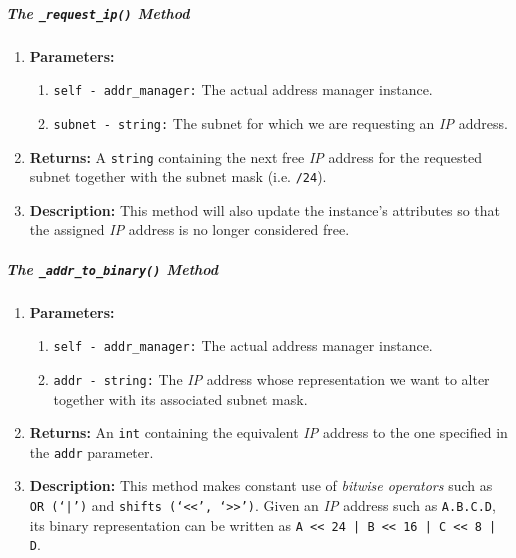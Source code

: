        \subparagraph{The \texttt{\_request\_ip()} Method}
            \begin{enumerate}
                \item \textbf{Parameters:}
                \begin{enumerate}
                    \item \texttt{self - addr\_manager:} The actual address manager instance.
                    \item \texttt{subnet - string:} The subnet for which we are  requesting an \textit{IP} address.
                \end{enumerate}
                \item \textbf{Returns:} A \texttt{string} containing the next free \textit{IP} address for the requested subnet together with the subnet mask (i.e. \texttt{/24}).
                \item \textbf{Description:} This method will also update the instance's attributes so that the assigned \textit{IP} address is no longer considered free.
            \end{enumerate}

        \subparagraph{The \texttt{\_addr\_to\_binary()} Method}
            \begin{enumerate}
                \item \textbf{Parameters:}
                \begin{enumerate}
                    \item \texttt{self - addr\_manager:} The actual address manager instance.
                    \item \texttt{addr - string:} The \textit{IP} address whose representation we want to alter together with its associated subnet mask.
                \end{enumerate}
                \item \textbf{Returns:} An \texttt{int} containing the equivalent \textit{IP} address to the one specified in the \texttt{addr} parameter.
                \item \textbf{Description:} This method makes constant use of \textit{bitwise operators} such as \texttt{OR (`|')} and \texttt{shifts (`<<', `>>')}. Given an \textit{IP} address such as \texttt{A.B.C.D}, its binary representation can be written as \texttt{A << 24 | B << 16 | C << 8 | D}.
            \end{enumerate}

